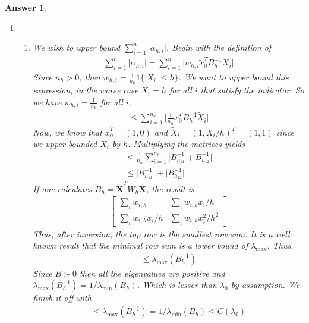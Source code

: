 \documentclass[12pt]{article}
\theoremstyle{colon}
\newtheorem*{answer}{Answer}
\begin{document}
\begin{answer}
\begin{enumerate}[label=\arabic*)]
    \item
      \leavevmode
      \begin{enumerate}[label=\alph*)]
        \item We wish to upper bound $\sum_{i=1}^n \lvert \alpha_{h,i} \rvert$. Begin with the definition of
          \begin{gather*}
            \sum_{i=1}^n \lvert \alpha_{h,i} \rvert = \sum_{i=1}^n \lvert w_{h,i} \tilde{x}_0^T B_h^{-1} \tilde{X}_i \rvert
          \end{gather*}
          Since $n_h > 0$, then $w_{h,i} = \frac{1}{n_h} 1\{ \lvert X_i \rvert \leq h \}$. We want to upper bound this expression, in the worse case $X_i = h$ for all $i$ that satisfy the indicator. So we have $w_{h,i} = \frac{1}{n_h}$ for all $i$.
          \begin{gather*}
            \leq \sum_{i=1}^{n_h} \lvert \frac{1}{n_h} \tilde{x}_0^T B_h^{-1} \tilde{X}_i \rvert
          \end{gather*}
          Now, we know that $\tilde{x}_0^T = (1,0)$ and $\tilde{X}_i = (1, X_i/h)^T = (1,1)$ since we upper bounded $X_i$ by $h$. Multiplying the matrices yields
          \begin{gather*}
            \leq \frac{1}{n_h} \sum_{i=1}^{n_h} \lvert B_{h_{11}}^{-1} + B_{h_{12}}^{-1} \rvert \\
            \leq \lvert B_{h_{11}}^{-1} \rvert + \lvert B_{h_{12}}^{-1} \rvert \tag{$\star)(\star$}
          \end{gather*}
          If one calculates $B_h = \tilde{\textbf{X}}^T W_h \tilde{\textbf{X}}$, the result is
          \begin{gather*}
            \begin{bmatrix}
              \sum_i w_{i,h} & \sum_i w_{i,h} x_i/h \\
              \sum_i w_{i,h} x_i/h & \sum_i w_{i,h} x_i^2/h^2
            \end{bmatrix}
          \end{gather*}
          Thus, after inversion, the top row is the smallest row sum. It is a well known result that the minimal row sum is a lower bound of $\lambda_{\max}$. Thus,
          \begin{gather*}
            \leq \lambda_{\max}(B_h^{-1})
          \end{gather*}
          Since $B \succ 0$ then all the eigenvalues are positive and $\lambda_{\max}(B_h^{-1}) = 1/\lambda_{\min}(B_h)$. Which is lesser than $\lambda_0$ by assumption. We finish it off with
          \begin{gather*}
            \leq \lambda_{\max}(B_h^{-1}) = 1/\lambda_{\min}(B_h) \leq C(\lambda_0)
          \end{gather*}


\end{enumerate}
\end{enumerate}
\end{answer}
\end{document}
